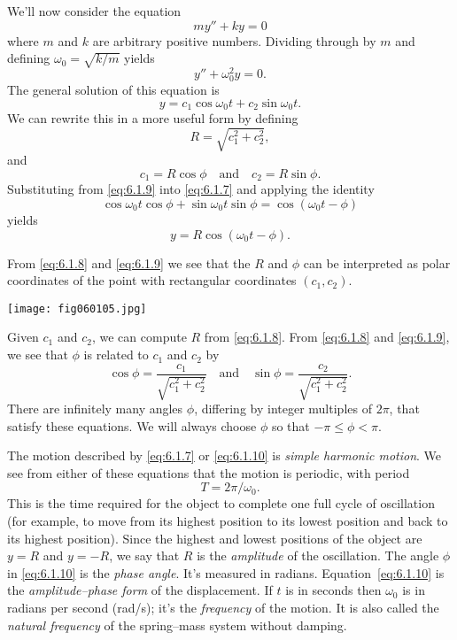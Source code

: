 \documentclass{ximera}
\begin{document}
We'll now consider the equation
$$
my''+ky=0
$$
where $m$ and $k$ are arbitrary positive numbers. Dividing through by
$m$ and defining $\omega_0=\sqrt{k/m}$ yields
$$
y''+\omega_0^2y=0.
$$
The general solution of this equation is
\begin{equation}\label{eq:6.1.7}
y=c_1\cos\omega_0t+c_2\sin\omega_0t.
\end{equation}
We can rewrite this in a more useful form by defining
\begin{equation}\label{eq:6.1.8}
R=\sqrt{c_1^2+c_2^2},
\end{equation}
and
\begin{equation}\label{eq:6.1.9}
c_1=R\cos\phi\quad\mbox{and}\quad c_2=R\sin\phi.
\end{equation}
Substituting from \eqref{eq:6.1.9} into \eqref{eq:6.1.7} and applying the
identity
$$
\cos\omega_0t\cos\phi+\sin\omega_0t\sin\phi=\cos(\omega_0t-\phi)
$$
yields
\begin{equation}\label{eq:6.1.10}
y=R\cos(\omega_0t-\phi).
\end{equation}
 
From \eqref{eq:6.1.8} and \eqref{eq:6.1.9} we see that the $R$ and $\phi$
can be interpreted as polar coordinates of the point with rectangular
coordinates $(c_1,c_2)$.
 
\begin{image}
  \texttt{[image: fig060105.jpg]}
\end{image}
 
Given $c_1$ and
$c_2$, we can compute $R$ from \eqref{eq:6.1.8}. From \eqref{eq:6.1.8} and
\eqref{eq:6.1.9}, we see that $\phi$ is related to $c_1$ and $c_2$ by
$$
\cos\phi=\frac{c_1}{\sqrt{c_1^2+c_2^2}}\quad\mbox{and}\quad\sin\phi=
\frac{c_2}{\sqrt{c_1^2+c_2^2}}.
$$
There are infinitely many angles $\phi$, differing
 by integer multiples of $2\pi$, that satisfy these equations. We
will always choose $\phi$ so that $-\pi\leq\phi<\pi$.
 
 
The motion described by \eqref{eq:6.1.7} or \eqref{eq:6.1.10}
is  \textit{simple harmonic motion}. We see from either of these
equations that the motion is periodic, with period
$$
T=2\pi/\omega_0.
$$
This is the time required for the object to complete one full cycle of
oscillation (for example, to move from its highest position to its
lowest position and back to its highest position). Since the highest
and lowest positions of the object are $y=R$ and $y=-R$, we say that
$R$ is the \textit{amplitude} of the oscillation. The angle $\phi$ in
\eqref{eq:6.1.10} is the \textit{phase angle}. It's measured
in
radians. Equation~\eqref{eq:6.1.10} is the \textit{amplitude--phase
form} of the displacement. If $t$ is in seconds then $\omega_0$ is
in radians per second (rad/s);   it's  the \textit{frequency} of
the motion. It is also called the \textit{natural frequency} of
the spring--mass system without damping.
 
\end{document}
